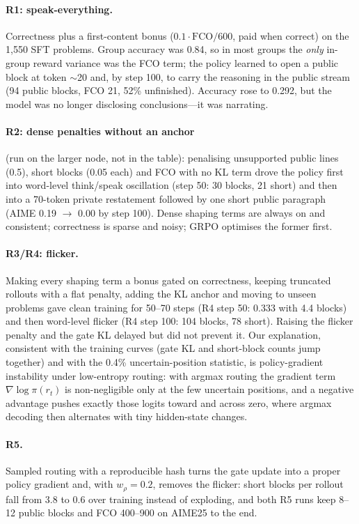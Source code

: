 \documentclass[letterpaper]{article} %
\begin{document}
\paragraph{R1: speak-everything.} Correctness plus a first-content bonus ($0.1\cdot\mathrm{FCO}/600$, paid when correct) on the 1,550 SFT problems. Group accuracy was 0.84, so in most groups the \emph{only} in-group reward variance was the FCO term; the policy learned to open a public block at token $\sim$20 and, by step 100, to carry the reasoning in the public stream (94 public blocks, FCO 21, 52\% unfinished). Accuracy rose to 0.292, but the model was no longer disclosing conclusions---it was narrating.
\paragraph{R2: dense penalties without an anchor} (run on the larger node, not in the table): penalising unsupported public lines (0.5), short blocks (0.05 each) and FCO with no KL term drove the policy first into word-level think/speak oscillation (step 50: 30 blocks, 21 short) and then into a 70-token private restatement followed by one short public paragraph (AIME 0.19 $\to$ 0.00 by step 100). Dense shaping terms are always on and consistent; correctness is sparse and noisy; GRPO optimises the former first.
\paragraph{R3/R4: flicker.} Making every shaping term a bonus gated on correctness, keeping truncated rollouts with a flat penalty, adding the KL anchor and moving to unseen problems gave clean training for 50--70 steps (R4 step 50: 0.333 with 4.4 blocks) and then word-level flicker (R4 step 100: 104 blocks, 78 short). Raising the flicker penalty and the gate KL delayed but did not prevent it. Our explanation, consistent with the training curves (gate KL and short-block counts jump together) and with the 0.4\% uncertain-position statistic, is policy-gradient instability under low-entropy routing: with argmax routing the gradient term $\nabla\log\pi(r_t)$ is non-negligible only at the few uncertain positions, and a negative advantage pushes exactly those logits toward and across zero, where argmax decoding then alternates with tiny hidden-state changes.
\paragraph{R5.} Sampled routing with a reproducible hash turns the gate update into a proper policy gradient and, with $w_\rho{=}0.2$, removes the flicker: short blocks per rollout fall from 3.8 to 0.6 over training instead of exploding, and both R5 runs keep 8--12 public blocks and FCO 400--900 on AIME25 to the end.
\end{document}
